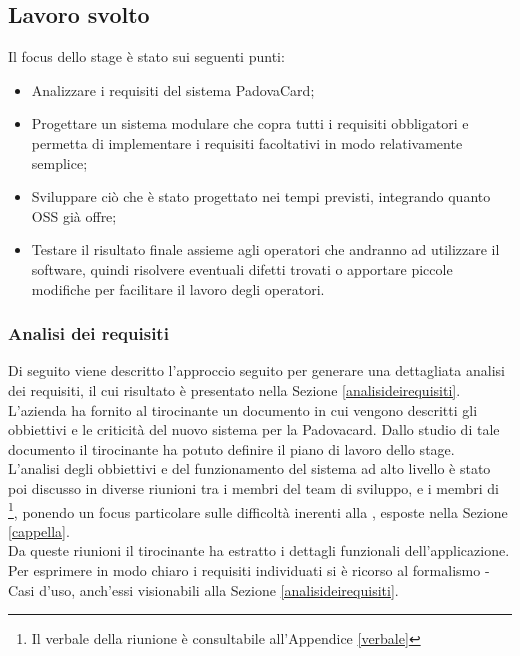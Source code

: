 \subsection{Lavoro svolto}
Il focus dello stage è stato sui seguenti punti:
\begin{itemize}
\item Analizzare i requisiti del sistema PadovaCard;
\item Progettare un sistema modulare che copra tutti i requisiti obbligatori e permetta di implementare i requisiti facoltativi in modo relativamente semplice;
\item Sviluppare ciò che è stato progettato nei tempi previsti, integrando quanto OSS già offre;
\item Testare il risultato finale assieme agli operatori che andranno ad utilizzare il software, quindi risolvere eventuali difetti trovati o apportare piccole modifiche per facilitare il lavoro degli operatori.
\end{itemize}

\subsubsection{Analisi dei requisiti}
Di seguito viene descritto l'approccio seguito per generare una dettagliata analisi dei requisiti, il cui risultato è presentato nella Sezione \ref{analisideirequisiti}. \\

L'azienda \net ha fornito al tirocinante un documento in cui vengono descritti gli obbiettivi e le criticità del nuovo sistema per la Padovacard. Dallo studio di tale documento il tirocinante ha potuto definire il piano di lavoro dello stage.\\

L'analisi degli obbiettivi e del funzionamento del sistema ad alto livello è stato poi discusso in diverse riunioni tra i membri del team di sviluppo, e i membri di \charta \footnote{Il verbale della riunione è consultabile all'Appendice \ref{verbale}}, ponendo un focus particolare sulle difficoltà inerenti alla \cappella, esposte nella Sezione \ref{cappella}.\\

Da queste riunioni il tirocinante ha estratto i dettagli funzionali dell’applicazione.
Per esprimere in modo chiaro i requisiti individuati si è ricorso al formalismo  - Casi d'uso, anch'essi visionabili alla Sezione \ref{analisideirequisiti}.\\

